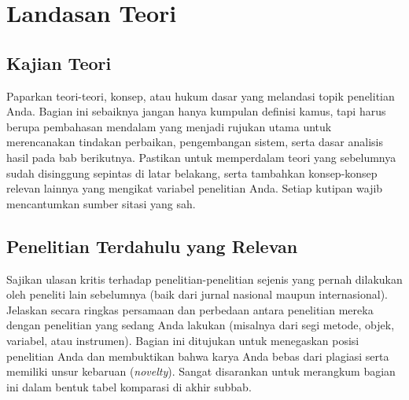 \chapter{Landasan Teori}


\section{Kajian Teori}

Paparkan teori-teori, konsep, atau hukum dasar yang melandasi topik penelitian Anda. Bagian ini sebaiknya jangan hanya kumpulan definisi kamus, tapi harus berupa pembahasan mendalam yang menjadi rujukan utama untuk merencanakan tindakan perbaikan, pengembangan sistem, serta dasar analisis hasil pada bab berikutnya. Pastikan untuk memperdalam teori yang sebelumnya sudah disinggung sepintas di latar belakang, serta tambahkan konsep-konsep relevan lainnya yang mengikat variabel penelitian Anda. Setiap kutipan wajib mencantumkan sumber sitasi yang sah.



\section{Penelitian Terdahulu yang Relevan}

Sajikan ulasan kritis terhadap penelitian-penelitian sejenis yang pernah dilakukan oleh peneliti lain sebelumnya (baik dari jurnal nasional maupun internasional). Jelaskan secara ringkas persamaan dan perbedaan antara penelitian mereka dengan penelitian yang sedang Anda lakukan (misalnya dari segi metode, objek, variabel, atau instrumen). Bagian ini ditujukan untuk menegaskan posisi penelitian Anda dan membuktikan bahwa karya Anda bebas dari plagiasi serta memiliki unsur kebaruan (\textit{novelty}). Sangat disarankan untuk merangkum bagian ini dalam bentuk tabel komparasi di akhir subbab.



